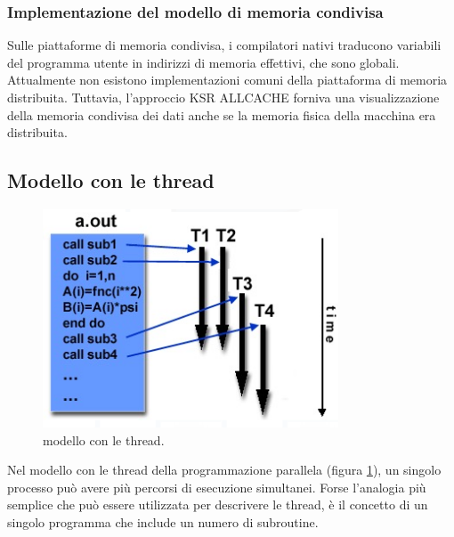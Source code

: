 \subsubsection{Implementazione del modello di memoria condivisa} Sulle piattaforme di memoria condivisa, i compilatori nativi traducono variabili del programma utente in indirizzi di memoria effettivi, che sono globali. Attualmente non esistono implementazioni comuni della piattaforma di memoria distribuita. Tuttavia, l'approccio KSR ALLCACHE forniva una visualizzazione della memoria condivisa dei dati anche se la memoria fisica della macchina era distribuita.
\subsection{Modello con le thread}
\begin{figure}[th]
	\centering
	\includegraphics[width=0.7\linewidth]{img/modello-thread}
	\caption{modello con le thread.}
	\label{fig:modello-thread}
\end{figure}
Nel modello con le thread della programmazione parallela (figura \ref{fig:modello-thread}), un singolo processo può avere più percorsi di esecuzione simultanei. Forse l'analogia più semplice che può essere utilizzata per descrivere le thread, è il concetto di un singolo programma che include un numero di subroutine.
